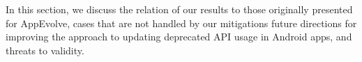 In this section, we discuss the relation of our
results to those originally presented for AppEvolve, cases that are not
handled by our mitigations future directions for improving the
approach to updating deprecated API usage in Android apps, and threats to validity.

%
%
%
%
%
%
%
